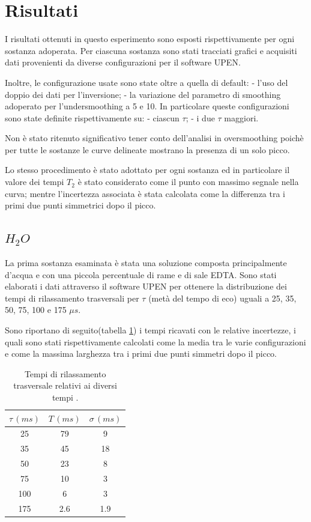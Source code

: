 \section*{Risultati}
I risultati ottenuti in questo esperimento sono esposti rispettivamente per ogni sostanza adoperata. 
Per ciascuna sostanza sono stati tracciati grafici e acquisiti dati provenienti da diverse configurazioni per il software UPEN. 

Inoltre, le configurazione usate sono state oltre a quella di default:  - l'uso del doppio dei dati per l'inversione; - la variazione del parametro di smoothing adoperato per l'undersmoothing a 5 e 10.
In particolare queste configurazioni sono state definite rispettivamente su: - ciascun $\tau$; - i due $\tau$ maggiori.

Non è stato ritenuto significativo tener conto dell'analisi in oversmoothing poichè per tutte le sostanze le curve delineate mostrano la presenza di un solo picco.

Lo stesso procedimento è stato adottato per ogni sostanza ed in particolare il valore dei tempi $T_2$ è stato considerato come il punto con massimo segnale nella curva; mentre l'incertezza associata è stata calcolata come la differenza tra i primi due punti simmetrici dopo il picco.

\subsection*{$H_2O$}
La prima sostanza esaminata è stata una soluzione composta principalmente d'acqua e con una piccola percentuale di rame e di sale EDTA.
Sono stati elaborati i dati attraverso il software UPEN per ottenere la distribuzione dei tempi di rilassamento trasversali per $\tau$ (metà del tempo di eco) uguali a 25, 35, 50, 75, 100 e 175 ${\mu}s$.

Sono riportano di seguito(tabella \ref{tab:T_h2o}) i tempi ricavati con le relative incertezze, i quali sono stati rispettivamente calcolati come la media tra le varie configurazioni e come la massima larghezza tra i primi due punti simmetri dopo il picco.

\begin{table}[h!]
    \begin{center}
    \begin{tabular}{c c c}
    \toprule
    	${\tau}\,(ms)$ & $T\,(ms)$ & ${\sigma}\,(ms)$ \\
    \midrule
	25 & 79 & 9 \\
	35 & 45 & 18 \\
	50 & 23 & 8 \\
	75 & 10 & 3 \\
	100 & 6 & 3 \\
	175 & 2.6 & 1.9\\
    \bottomrule
    \end{tabular}
    \caption{Tempi di rilassamento trasversale relativi ai diversi tempi \tau.}
    \label{tab:T_h2o}
    \end{center}
\end{table}

